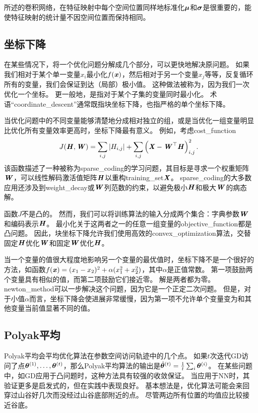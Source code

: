 所述的卷积网络，在特征映射中每个空间位置同样地标准化$\boldsymbol{\mu}$和$\boldsymbol{\sigma}$是很重要的，能使特征映射的统计量不因空间位置而保持相同。

\subsection{坐标下降}
\label{sec:coordinate_descent}
在某些情况下，将一个优化问题分解成几个部分，可以更快地解决原问题。
如果我们相对于某个单一变量$x_i$最小化$f(\boldsymbol{\mathit{x}})$，然后相对于另一个变量$x_j$等等，反复循环所有的变量，我们会保证到达（局部）极小值。
这种做法被称为，因为我们一次优化一个坐标。
更一般地，是指对于某个子集的变量同时最小化。
术语``\gls{coordinate_descent}''通常既指块坐标下降，也指严格的单个坐标下降。


当优化问题中的不同变量能够清楚地分成相对独立的组，或是当优化一组变量明显比优化所有变量效率更高时，坐标下降最有意义。
例如，考虑\gls{cost_function}
\begin{equation}
    J(\boldsymbol{\mathit{H}}, \boldsymbol{\mathit{W}}) = \sum_{i,j} |H_{i,j}| + \sum_{i,j} \left( \boldsymbol{\mathit{X}} - \boldsymbol{\mathit{W}}^\top \boldsymbol{\mathit{H}} \right)_{i,j}^2 .
\end{equation}
该函数描述了一种被称为\gls{sparse_coding}的学习问题，其目标是寻求一个权重矩阵$\boldsymbol{\mathit{W}}$，可以线性解码激活值矩阵$\boldsymbol{\mathit{H}}$以重构\gls{training_set}$\boldsymbol{\mathit{X}}$。
\gls{sparse_coding}的大多数应用还涉及到\gls{weight_decay}或$\boldsymbol{\mathit{W}}$列范数的约束，以避免极小$\boldsymbol{\mathit{H}}$和极大$\boldsymbol{\mathit{W}}$的病态解。

函数$J$不是凸的。
然而，我们可以将训练算法的输入分成两个集合：字典参数$\boldsymbol{\mathit{W}}$和编码表示$\boldsymbol{\mathit{H}}$。
最小化关于这两者之一的任意一组变量的\gls{objective_function}都是凸问题。
因此，块坐标下降允许我们使用高效的\gls{convex_optimization}算法，交替固定$\boldsymbol{\mathit{H}}$优化$\boldsymbol{\mathit{W}}$和固定$\boldsymbol{\mathit{W}}$优化$\boldsymbol{\mathit{H}}$。

当一个变量的值很大程度地影响另一个变量的最优值时，坐标下降不是一个很好的方法，如函数$f(\boldsymbol{\mathit{x}})=(x_1 - x_2)^2+\alpha(x_1^2 + x_2^2)$，其中$\alpha$是正值常数。
第一项鼓励两个变量具有相似的值，而第二项鼓励它们接近零。
解是两者都为零。
\gls{newton_method}可以一步解决这个问题，因为它是一个正定二次问题。
但是，对于小值$\alpha$而言，坐标下降会使进展非常缓慢，因为第一项不允许单个变量变为和其他变量当前值显著不同的值。


\subsection{Polyak平均}
\label{sec:polyak_averaging}
Polyak平均\citep{Polyak+Juditsky-1992}会平均优化算法在参数空间访问轨迹中的几个点。
如果$t$次迭代\gls{GD}访问了点$\boldsymbol{\theta}^{(1)},\dots,\boldsymbol{\theta}^{(t)}$，那么Polyak平均算法的输出是$\hat{\boldsymbol{\theta}}^{(t)} = \frac{1}{t} \sum_i \boldsymbol{\theta}^{(i)}$。
在某些问题中，如\gls{GD}应用于凸问题时，这种方法具有较强的收敛保证。
当应用于\gls{NN}时，其验证更多是启发式的，但在实践中表现良好。
基本想法是，优化算法可能会来回穿过山谷好几次而没经过山谷底部附近的点。
尽管两边所有位置的均值应比较接近谷底。

